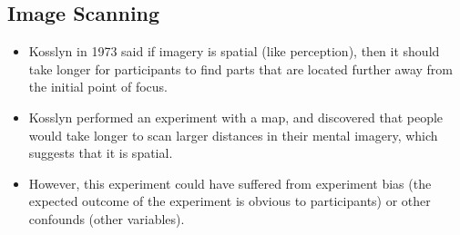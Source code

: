 \documentclass[]{article}
\begin{document}
		\subsection{Image Scanning}
			\begin{itemize}
				\item Kosslyn in 1973 said if imagery is spatial (like perception), then it should take longer for participants to find parts that are located further away from the initial point of focus.
				\item Kosslyn performed an experiment with a map, and discovered that people would take longer to scan larger distances in their mental imagery, which suggests that it is spatial.
				\item However, this experiment could have suffered from experiment bias (the expected outcome of the experiment is obvious to participants) or other confounds (other variables).
			\end{itemize}
\end{document}
